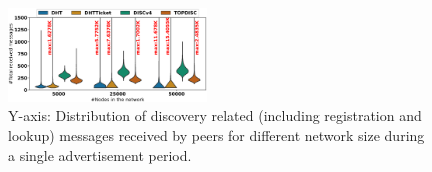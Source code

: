 %
%

%


\begin{figure}[!h]
\centering
\includegraphics[width=0.470\textwidth]{results/no_split/violin_size_totalMsg.eps}
\caption{Y-axis: Distribution of discovery related (including registration and lookup) messages received by peers for different network size during a single advertisement period.}
\label{fig:msgsPerSize}
\vspace{-0.15in}
\end{figure}

